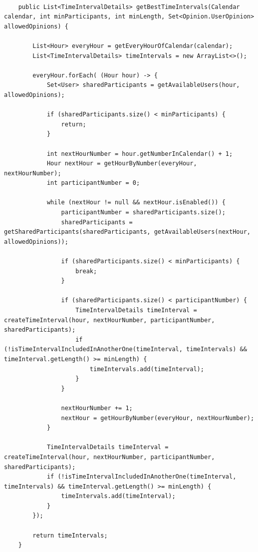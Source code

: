 \documentclass[a4paper,12pt]{report}
\theoremstyle{definition}
\theoremstyle{remark}
\begin{document}
\begin{lstlisting}

    public List<TimeIntervalDetails> getBestTimeIntervals(Calendar calendar, int minParticipants, int minLength, Set<Opinion.UserOpinion> allowedOpinions) {

        List<Hour> everyHour = getEveryHourOfCalendar(calendar);
        List<TimeIntervalDetails> timeIntervals = new ArrayList<>();

        everyHour.forEach( (Hour hour) -> {
            Set<User> sharedParticipants = getAvailableUsers(hour, allowedOpinions);

            if (sharedParticipants.size() < minParticipants) {
                return;
            }

            int nextHourNumber = hour.getNumberInCalendar() + 1;
            Hour nextHour = getHourByNumber(everyHour, nextHourNumber);
            int participantNumber = 0;

            while (nextHour != null && nextHour.isEnabled()) {
                participantNumber = sharedParticipants.size();
                sharedParticipants =  getSharedParticipants(sharedParticipants, getAvailableUsers(nextHour, allowedOpinions));

                if (sharedParticipants.size() < minParticipants) {
                    break;
                }

                if (sharedParticipants.size() < participantNumber) {
                    TimeIntervalDetails timeInterval = createTimeInterval(hour, nextHourNumber, participantNumber, sharedParticipants);
                    if (!isTimeIntervalIncludedInAnotherOne(timeInterval, timeIntervals) && timeInterval.getLength() >= minLength) {
                        timeIntervals.add(timeInterval);
                    }
                }

                nextHourNumber += 1;
                nextHour = getHourByNumber(everyHour, nextHourNumber);
            }

            TimeIntervalDetails timeInterval = createTimeInterval(hour, nextHourNumber, participantNumber, sharedParticipants);
            if (!isTimeIntervalIncludedInAnotherOne(timeInterval, timeIntervals) && timeInterval.getLength() >= minLength) {
                timeIntervals.add(timeInterval);
            }
        });

        return timeIntervals;
    }


\end{lstlisting}
\begin{center}



\end{center}


\vspace{2 cm}
\end{document}
